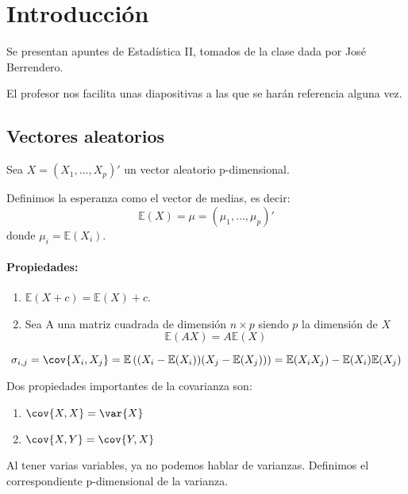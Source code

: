 \section{Introducción}
Se presentan apuntes de Estadística II, tomados de la clase dada por José Berrendero.

El profesor nos facilita unas diapositivas a las que se harán referencia alguna vez. 

\subsection{Vectores aleatorios}


Sea $X = (X_1, \dots , X_p)'$ un vector aleatorio p-dimensional.


\begin{defn}[Esperanza]
	Definimos la esperanza como el vector de medias, es decir:
	\[
	\mathbb{E}(X) = μ = (μ_1,\dots,μ_p)'
	\]
	donde $μ_i = \mathbb{E}(X_i)$.
\end{defn}


\paragraph{Propiedades:}
\begin{enumerate}
\item $\mathbb{E}(X+c) = \mathbb{E}(X)+c$. 
\item Sea A una matriz cuadrada de dimensión $n\times p$ siendo $p$ la dimensión de $X$ \[\mathbb{E}(AX) = A\mathbb{E}(X)\]

\end{enumerate}



\begin{defn}[Covarianza]
\[\sigma_{i,j} = \cov{X_i,X_j} = \mathbb{E}\left((X_i-\mathbb{E}(X_i))(X_j-\mathbb{E}(X_j))\right) = \mathbb{E}(X_i X_j)-\mathbb{E}(X_i)\mathbb{E}(X_j)\]

Dos propiedades importantes de la covarianza son:

\begin{enumerate}
\item $\cov{X,X}= \var{X}$
\item $\cov{X,Y}=\cov{Y,X}$
\end{enumerate}

\end{defn}

Al tener varias variables, ya no podemos hablar de varianzas. Definimos el correspondiente p-dimensional de la varianza.



